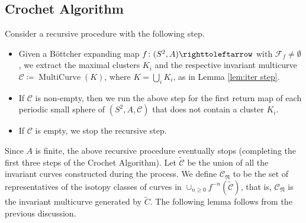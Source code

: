 \documentclass{amsart}
\theoremstyle{plain}
\theoremstyle{definition}
\theoremstyle{remark}
\newcommand{\reminder}[1]{\textsl{$\lhd\rhd$#1$\lhd\rhd$}\marginpar{$\lhd\rhd\lhd\rhd\lhd\rhd$}}%
\newcommand{\hide}[1]{}
\newcommand{\CC}{{\mathcal C}}
\newcommand{\NL}{{\mathfrak N}}
\newcommand{\MC}{{\operatorname{MultiCurve}}}
\newcommand\selfmap{\righttoleftarrow}
\begin{document}
\subsection{Crochet Algorithm}
\label{ss:iter_construction}
Consider a recursive procedure with the following step.

 \begin{itemize}
    \item Given a B\"ottcher expanding map $f\colon (S^2,A)\selfmap$ with $\mathcal{F}_f\neq\emptyset$, we extract the maximal clusters $K_i$ and the respective invariant multicurve $\CC\coloneq \MC(K)$, where $K=\bigcup_i K_i$, as in Lemma \ref{lem:iter step}. 
   \item If $\CC$ is non-empty, then we run the above step for the first return map of each periodic small sphere of $(S^2,A, \CC)$ that does not contain a cluster $K_i$.
   \item If $\CC$ is empty, we stop the recursive step. 
\end{itemize}




    

Since $A$ is finite, the above recursive procedure eventually stops (completing the first three steps of the Crochet Algorithm). Let $\widetilde{\CC}$ be the union of all the invariant curves constructed during the process. We define $\CC_\NL$ to be the set of representatives of the isotopy classes of curves in $\cup_{n\geq 0} f^{-n}(\widetilde{\CC})$, that is, $\CC_\NL$ is the invariant multicurve generated by $\widetilde{C}$.  The following lemma follows from the previous discussion.
\end{document}
